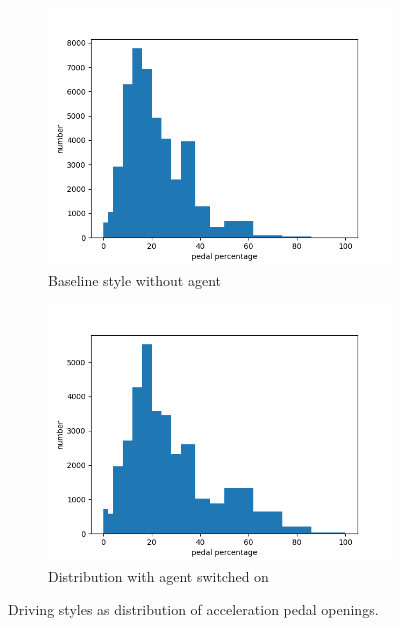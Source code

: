 \documentclass{article}
\begin{document}
\begin{figure}[htbp]
	\centering
	\begin{subfigure}[b]{0.45\textwidth}
		\centering
		\includegraphics[width=\textwidth]{images/no-ai-driving-style.png}
		\caption{Baseline style without agent}\label{fig:driving style without agent}
	\end{subfigure}
	\hfill
	\begin{subfigure}[b]{0.45\textwidth}
		\centering
		\includegraphics[width=\textwidth]{images/ai-driving-style.png}
		\caption{Distribution with agent switched on}\label{fig:driving style with agent}
	\end{subfigure}\caption{\label{fig:driving styles} Driving styles as distribution of acceleration pedal openings.}
\end{figure}
\end{document}
